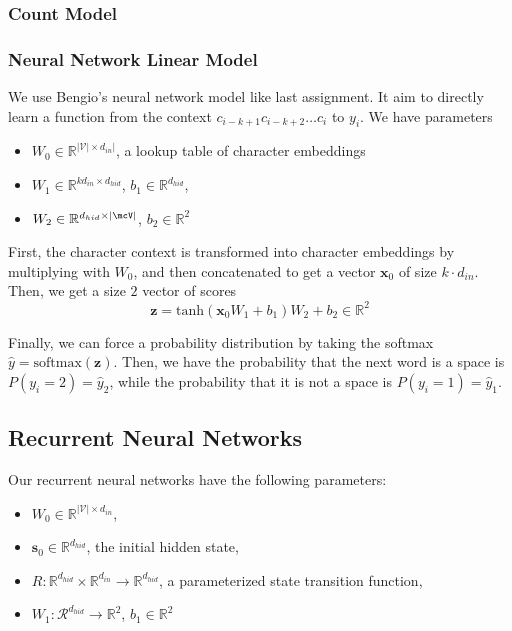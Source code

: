\documentclass[11pt]{article}
\begin{document}
\subsubsection{Count Model}

\subsubsection{Neural Network Linear Model}

We use Bengio's neural network model like last assignment. It aim to directly learn a function from the context $c_{i-k+1}c_{i-k+2}\dots c_i$ to $y_i$. We have parameters
\begin{itemize}
  \item $W_0 \in \mathbb{R}^{|\mathcal{V}| \times d_{in}|}$, a lookup table of character embeddings
  \item $W_1 \in \mathbb{R}^{kd_{in} \times d_{hid}}$, $b_1 \in \mathbb{R}^{d_{hid}}$,
  \item $W_2 \in \mathbb{R}^{d_{hid} \times |\mcV|}$, $b_2 \in \mathbb{R}^{2}$
\end{itemize}

First, the character context is transformed into character embeddings by multiplying with $W_0$, and then concatenated to get a vector $\mathbf{x}_0$ of size $k \cdot d_{in}$. Then, we get a size $2$ vector of scores
$$\mathbf{z} = \text{tanh}(\mathbf{x}_0W_1 + b_1)W_2 + b_2 \in \mathbb{R}^2$$

Finally, we can force a probability distribution by taking the softmax $\hat{y} = \text{softmax}(\mathbf{z})$. Then, we have the probability that the next word is a space is $P(y_i = 2) = \hat{y}_2$, while the probability that it is not a space is $P(y_i = 1) = \hat{y}_1$. 

\subsection{Recurrent Neural Networks}

Our recurrent neural networks have the following parameters:
\begin{itemize}
  \item $W_0 \in \mathbb{R}^{|\mathcal{V}| \times d_{in}}$,
  \item $\mathbf{s}_0 \in \mathbb{R}^{d_{hid}}$, the initial hidden state,
  \item $R: \mathbb{R}^{d_{hid}} \times \mathbb{R}^{d_{in}} \to \mathbb{R}^{d_{hid}}$, a parameterized state transition function,
  \item $W_1: \mathcal{R}^{d_{hid}} \to \mathbb{R}^2$, $b_1 \in \mathbb{R}^{2}$
\end{itemize}
\end{document}
